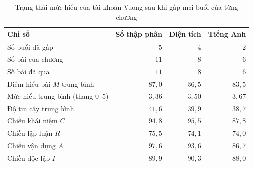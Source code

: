 \begin{table}[H]
\centering
\caption{Trạng thái mức hiểu của tài khoản Vuong sau khi gấp mọi buổi của từng chương}\label{tab:db-mastery}
\begin{tabular}{lrrr}
\toprule
Chỉ số & Số thập phân & Diện tích & Tiếng Anh \\
\midrule
Số buổi đã gấp & $5$ & $4$ & $2$ \\
Số bài của chương & $11$ & $8$ & $6$ \\
Số bài đã qua & $11$ & $8$ & $6$ \\
Điểm hiểu bài $M$ trung bình & $87{,}0$ & $86{,}5$ & $83{,}5$ \\
Mức hiểu trung bình (thang $0$--$5$) & $3{,}36$ & $3{,}50$ & $3{,}67$ \\
Độ tin cậy trung bình & $41{,}6$ & $39{,}9$ & $38{,}7$ \\
Chiều khái niệm $C$ & $94{,}8$ & $95{,}5$ & $87{,}8$ \\
Chiều lập luận $R$ & $75{,}5$ & $74{,}1$ & $74{,}0$ \\
Chiều vận dụng $A$ & $97{,}6$ & $93{,}6$ & $86{,}7$ \\
Chiều độc lập $I$ & $89{,}9$ & $90{,}3$ & $88{,}0$ \\
\bottomrule
\end{tabular}
\end{table}
